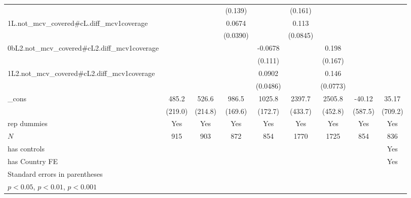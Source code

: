 {\begin{tabular}{l*{8}{c}}
          &                  &                  &  (0.139)         &                  &  (0.161)         &                  &                  &                  \\
[1em]
1L.not\_mcv\_covered#cL.diff\_mcv1coverage&                  &                  &   0.0674         &                  &    0.113         &                  &                  &                  \\
          &                  &                  & (0.0390)         &                  & (0.0845)         &                  &                  &                  \\
[1em]
0bL2.not\_mcv\_covered#cL2.diff\_mcv1coverage&                  &                  &                  &  -0.0678         &                  &    0.198         &                  &                  \\
          &                  &                  &                  &  (0.111)         &                  &  (0.167)         &                  &                  \\
[1em]
1L2.not\_mcv\_covered#cL2.diff\_mcv1coverage&                  &                  &                  &   0.0902         &                  &    0.146         &                  &                  \\
          &                  &                  &                  & (0.0486)         &                  & (0.0773)         &                  &                  \\
[1em]
\_cons    &    485.2\sym{*}  &    526.6\sym{*}  &    986.5\sym{***}&   1025.8\sym{***}&   2397.7\sym{***}&   2505.8\sym{***}&   -40.12         &    35.17         \\
          &  (219.0)         &  (214.8)         &  (169.6)         &  (172.7)         &  (433.7)         &  (452.8)         &  (587.5)         &  (709.2)         \\
[1em]
rep dummies &      Yes         &      Yes         &      Yes         &      Yes         &      Yes         &      Yes         &      Yes         &      Yes         \\
\hline
\(N\)     &      915         &      903         &      872         &      854         &     1770         &     1725         &      854         &      836         \\
has controls&                  &                  &                  &                  &                  &                  &                  &      Yes         \\
has Country FE&                  &                  &                  &                  &                  &                  &                  &      Yes         \\
\hline\hline
\multicolumn{9}{l}{\footnotesize Standard errors in parentheses}\\
\multicolumn{9}{l}{\footnotesize \sym{*} \(p<0.05\), \sym{**} \(p<0.01\), \sym{***} \(p<0.001\)}\\
\end{tabular}
}
